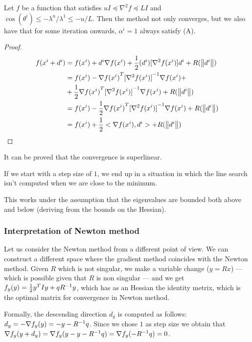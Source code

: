 \documentclass[ComputationalMathematics.tex]{subfiles}
\begin{document}
\begin{theorem}
  Let $f$ be a function that satisfies $u I \preceq \nabla^2 f \preceq L I$ and $\cos(\theta^i) \leq - \lambda^n / \lambda^1 \leq - u / L$. Then the method not only converges, but we also have that for some iteration onwards, $\alpha^i = 1$ always satisfy (A).
\end{theorem}

\begin{proof}
  \begin{equation}
    \begin{aligned}
      f(x^i + d^i) &= f(x^i) + d^i \nabla f(x^i) + \frac{1}{2} (d^i) [\nabla^2 f(x^i)] d^i +  R(\left\lVert d^i\right\rVert)\\
      &= f(x^i) - {\nabla f(x^i)}^{T} {[\nabla^2 f(x^i)]}^{-1} \nabla f(x^i) + \\
      &+ \frac{1}{2} {\nabla f(x^i)}^{T} {[\nabla^2 f(x^i)]}^{-1} \nabla f(x^i) + R(\left\lVert d^i\right\rVert)\\
      &= f(x^i) - \frac{1}{2} {\nabla f(x^i)}^{T} {[ \nabla^2 f(x^i)]}^{-1} \nabla f(x^i) + R(\left\lVert d^i\right\rVert)\\
      &= f(x^i) + \frac{1}{2} <\nabla f(x^i), d^i> + R(\left\lVert d^i\right\rVert)
    \end{aligned}
  \end{equation}
\end{proof}
It can be proved that the convergence is superlinear.

If we start with a step size of $1$, we end up in a situation in which the line search isn't computed when we are close to the minimum.

This works under the assumption that the eigenvalues are bounded both above and below (deriving from the bounds on the Hessian).

\subsubsection{Interpretation of Newton method}
Let us consider the Newton method from a different point of view. We can construct a different space where the gradient method coincides with the Newton method.
Given $R$ which is not singular, we make a variable change ($y = R x$) --- which is possible given that $R$ is non singular --- and we get $f_y(y) = \frac{1}{2} {y}^{T} I y + q {R}^{-1} y$, which has as an Hessian the identity metrix, which is the optimal matrix for convergence in Newton method.

Formally, the descending direction $d_y$ is computed as follows:
$d_y = - \nabla f_y(y) = - y - {R}^{-1} q$. Since we chose $1$ as step size we obtain that $\nabla f_y(y + d_y) = \nabla f_y (y - y - {R}^{-1} q) = \nabla f_y(-{R}^{-1} q) = 0$.
\end{document}
